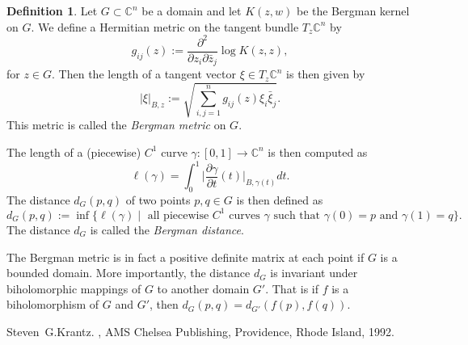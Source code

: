 \documentclass[12pt]{article}
\theoremstyle{theorem}
\theoremstyle{definition}
\newtheorem*{defn}{Definition}
\begin{document}
\begin{defn}
Let $G \subset {\mathbb{C}}^n$ be a domain and let $K(z,w)$ be the Bergman kernel
on $G$.  We define a Hermitian metric on the tangent bundle $T_z {\mathbb{C}}^n$ by
\begin{equation*}
g_{ij} (z)
:=
\frac{\partial^2}{\partial z_i \partial \bar{z}_j}
\log K(z,z) ,
\end{equation*}
for $z \in G$.  Then the length of a tangent vector $\xi \in T_z{\mathbb{C}}^n$ is then
given by
\begin{equation*}
\lvert \xi \rvert_{B,z}
:=
\sqrt{\sum_{i,j=1}^n g_{ij}(z) \xi_i \bar{\xi}_j }.
\end{equation*} 
This metric is called the {\em Bergman metric} on $G$.
\end{defn}

The length of a (piecewise) $C^1$ curve $\gamma \colon [0,1] \to {\mathbb{C}}^n$ is
then computed as
\begin{equation*}
\ell (\gamma) =
\int_0^1 \big\lvert \frac{\partial \gamma}{\partial t}(t) \big\rvert_{B,\gamma(t)} dt .
\end{equation*}
The distance $d_G(p,q)$ of two points $p,q \in G$ is then defined as
\begin{equation*}
d_G(p,q):=
\inf \{ \ell (\gamma) \mid \text{ all piecewise $C^1$ curves $\gamma$ such that $\gamma(0)=p$ and $\gamma(1)=q$} \} .
\end{equation*}
The distance $d_G$ is called the {\em Bergman distance}.

The Bergman metric is in fact a positive definite matrix at each point if $G$ is a bounded domain.  More importantly, the distance $d_G$ is invariant under
biholomorphic mappings of $G$ to another domain $G'$.  That is if $f$
is a biholomorphism of $G$ and $G'$, then $d_G(p,q) = d_{G'}(f(p),f(q))$.

\begin{thebibliography}{9}
Steven~G.\@ Krantz.
{\em {}},
AMS Chelsea Publishing, Providence, Rhode Island, 1992.
\end{thebibliography}
\end{document}
